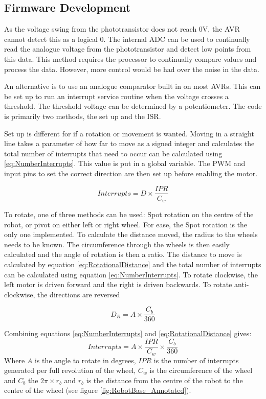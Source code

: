 \subsection{Firmware Development}

As the voltage swing from the phototransistor does not reach 0V, the AVR cannot detect this as a logical 0. The internal ADC can be used to continually read the analogue voltage from the phototransistor and detect low points from this data. This method requires the processor to continually compare values and process the data. However, more control would be had over the noise in the data.

An alternative is to use an analogue comparator built in on most AVRs. This can be set up to run an interrupt service routine when the voltage crosses a threshold. The threshold voltage can be determined by a potentiometer. The code is primarily two methods, the set up and the ISR.

Set up is different for if a rotation or movement is wanted. Moving in a straight line takes a parameter of how far to move as a signed integer and calculates the total number of interrupts that need to occur can be calculated using \eqref{eq:NumberInterrupts}. This value is put in a global variable. The PWM and input pins to set the correct direction are then set up before enabling the motor. 

\begin{equation}
\label{eq:NumberInterrupts}
Interrupts = D \times \frac{IPR}{C_w}
\end{equation}

To rotate, one of three methods can be used: Spot rotation on the centre of the robot, or pivot on either left or right wheel. For ease, the Spot rotation is the only one implemented. To calculate the distance moved, the radius to the wheels needs to be known. The circumference through the wheels is then easily calculated and the angle of rotation is then a ratio. The distance to move is calculated by equation \eqref{eq:RotationalDistance} and the total number of interrupts can be calculated using equation \eqref{eq:NumberInterrupts}. To rotate clockwise, the left motor is driven forward and the right is driven backwards. To rotate anti-clockwise, the directions are reversed

\begin{equation}
\label{eq:RotationalDistance}
D_{R} = A \times \frac{C_b}{360}
\end{equation}

Combining equations \eqref{eq:NumberInterrupts} and \eqref{eq:RotationalDistance} gives:
\begin{equation}
\label{eq:RotationalInterrupts}
Interrupts = A \times \frac{IPR}{C_w} \times \frac{C_b}{360}
\end{equation}
Where $A$ is the angle to rotate in degrees, $IPR$ is the number of interrupts generated per full revolution of the wheel, $C_w$ is the circumference of the wheel and $C_b$ the $2\pi\times r_b$ and $r_b$ is the distance from the centre of the robot to the centre of the wheel (see figure \ref{fig:RobotBase_Annotated}).



